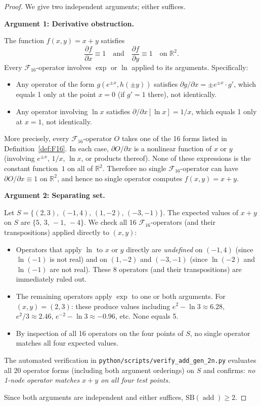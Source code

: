 \documentclass[12pt,a4paper]{article}
\theoremstyle{definition}
\newcommand{\addop}{\operatorname{add}}
\newcommand{\SB}{\mathrm{SB}}
\newcommand{\F}{\mathcal{F}_{16}}
\newcommand{\R}{\mathbb{R}}
\begin{document}
\begin{proof}
We give two independent arguments; either suffices.

\medskip
\noindent\textbf{Argument 1: Derivative obstruction.}

The function $f(x,y) = x + y$ satisfies
\[
  \frac{\partial f}{\partial x} \equiv 1 \quad\text{and}\quad
  \frac{\partial f}{\partial y} \equiv 1
  \quad\text{on }\R^2.
\]
Every $\F$-operator involves $\exp$ or $\ln$ applied to its arguments.
Specifically:
\begin{itemize}
  \item Any operator of the form $g(e^{\pm x}, h(\pm y))$ satisfies
    $\partial g / \partial x = \pm e^{\pm x} \cdot g'$, which equals 1 only
    at the point $x = 0$ (if $g' = 1$ there), not identically.
  \item Any operator involving $\ln x$ satisfies
    $\partial / \partial x[\ln x] = 1/x$, which equals 1 only at $x = 1$,
    not identically.
\end{itemize}
More precisely, every $\F$-operator $O$ takes one of the 16 forms
listed in Definition~\ref{def:F16}.
In each case, $\partial O / \partial x$ is a nonlinear function of $x$ or $y$
(involving $e^{\pm x}$, $1/x$, $\ln x$, or products thereof).
None of these expressions is the constant function~$1$ on all of $\R^2$.
Therefore no single $\F$-operator can have $\partial O / \partial x \equiv 1$
on $\R^2$, and hence no single operator computes $f(x,y) = x+y$.

\medskip
\noindent\textbf{Argument 2: Separating set.}

Let $S = \{(2,3),\,(-1,4),\,(1,-2),\,(-3,-1)\}$.
The expected values of $x + y$ on $S$ are $\{5,\,3,\,-1,\,-4\}$.
We check all 16 $\F$-operators (and their transpositions) applied directly to
$(x,y)$:
\begin{itemize}
  \item Operators that apply $\ln$ to $x$ or $y$ directly are \emph{undefined}
    on $(-1,4)$ (since $\ln(-1)$ is not real) and on $(1,-2)$ and $(-3,-1)$
    (since $\ln(-2)$ and $\ln(-1)$ are not real).
    These 8 operators (and their transpositions) are immediately ruled out.
  \item The remaining operators apply $\exp$ to one or both arguments.
    For $(x,y) = (2,3)$: these produce values including $e^2 - \ln 3 \approx 6.28$,
    $e^2 / 3 \approx 2.46$, $e^{-2} - \ln 3 \approx -0.96$, etc.
    None equals 5.
  \item By inspection of all 16 operators on the four points of $S$, no single
    operator matches all four expected values.
\end{itemize}
The automated verification in \texttt{python/scripts/verify\_add\_gen\_2n.py}
evaluates all 20 operator forms (including both argument orderings) on $S$ and
confirms: \emph{no 1-node operator matches $x + y$ on all four test points.}

\medskip
Since both arguments are independent and either suffices, $\SB(\addop) \ge 2$.
\end{proof}
\end{document}

